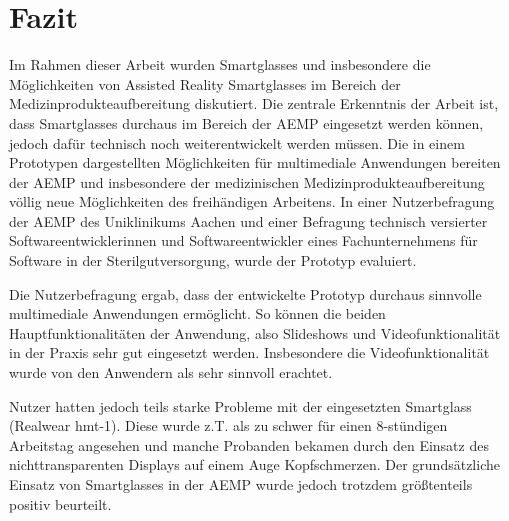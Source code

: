 %
%
%
%
%
%
\chapter{Fazit}
\label{ch:Fazit}

Im Rahmen dieser Arbeit wurden Smartglasses und insbesondere die Möglichkeiten von Assisted Reality Smartglasses im Bereich der Medizinprodukteaufbereitung diskutiert. Die zentrale Erkenntnis der Arbeit ist, dass Smartglasses durchaus im Bereich der AEMP eingesetzt werden können, jedoch dafür technisch noch weiterentwickelt werden müssen. Die in einem Prototypen dargestellten Möglichkeiten für multimediale Anwendungen bereiten der AEMP und insbesondere der medizinischen Medizinprodukteaufbereitung völlig neue Möglichkeiten des freihändigen Arbeitens. In einer Nutzerbefragung der AEMP des Uniklinikums Aachen und einer Befragung technisch versierter  Softwareentwicklerinnen und Softwareentwickler eines Fachunternehmens für Software in der Sterilgutversorgung, wurde der Prototyp evaluiert.

Die Nutzerbefragung ergab, dass der entwickelte Prototyp durchaus sinnvolle multimediale Anwendungen ermöglicht. So können die beiden Hauptfunktionalitäten der Anwendung, also Slideshows und Videofunktionalität in der Praxis sehr gut eingesetzt werden. Insbesondere die Videofunktionalität wurde von den Anwendern als sehr sinnvoll erachtet. 

Nutzer hatten jedoch teils starke Probleme mit der eingesetzten Smartglass (Realwear hmt-1). Diese wurde z.T. als zu schwer für einen 8-stündigen Arbeitstag angesehen und manche Probanden bekamen durch den Einsatz des nichttransparenten Displays auf einem Auge Kopfschmerzen. Der grundsätzliche Einsatz von Smartglasses in der AEMP wurde jedoch trotzdem größtenteils positiv beurteilt.
%
